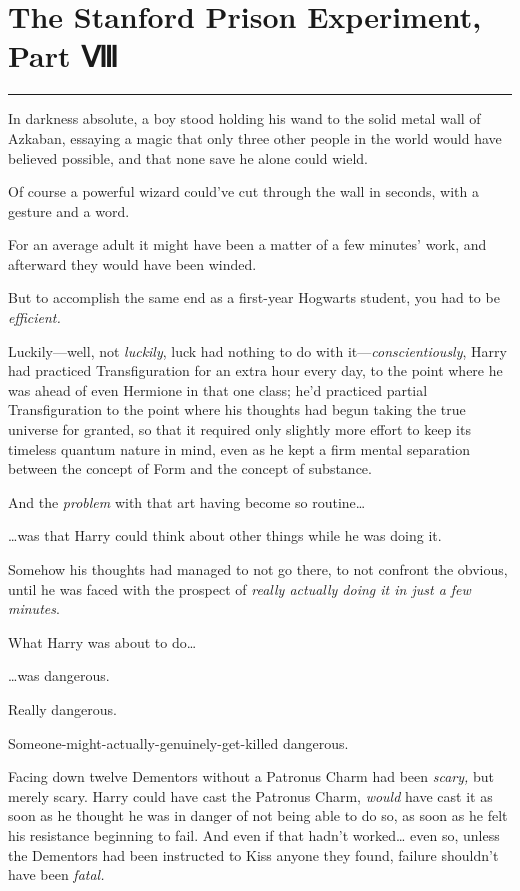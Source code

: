 \chapter{The Stanford Prison Experiment, Part Ⅷ}

\begin{center}\rule{3in}{0.4pt}\end{center}

In darkness absolute, a boy stood holding his wand to the solid metal
wall of Azkaban, essaying a magic that only three other people in the
world would have believed possible, and that none save he alone could
wield.

Of course a powerful wizard could've cut through the wall in seconds,
with a gesture and a word.

For an average adult it might have been a matter of a few minutes' work,
and afterward they would have been winded.

But to accomplish the same end as a first-year Hogwarts student, you had
to be \emph{efficient.}

Luckily---well, not \emph{luckily}, luck had nothing to do with
it---\emph{conscientiously}, Harry had practiced Transfiguration for an
extra hour every day, to the point where he was ahead of even Hermione
in that one class; he'd practiced partial Transfiguration to the point
where his thoughts had begun taking the true universe for granted, so
that it required only slightly more effort to keep its timeless quantum
nature in mind, even as he kept a firm mental separation between the
concept of Form and the concept of substance.

And the \emph{problem} with that art having become so routine\ldots{}

\ldots{}was that Harry could think about other things while he was doing
it.

Somehow his thoughts had managed to not go there, to not confront the
obvious, until he was faced with the prospect of \emph{really actually
doing it in just a few minutes}.

What Harry was about to do\ldots{}

\ldots{}was dangerous.

Really dangerous.

Someone-might-actually-genuinely-get-killed dangerous.

Facing down twelve Dementors without a Patronus Charm had been
\emph{scary,} but merely scary. Harry could have cast the Patronus
Charm, \emph{would} have cast it as soon as he thought he was in danger
of not being able to do so, as soon as he felt his resistance beginning
to fail. And even if that hadn't worked\ldots{} even so, unless the
Dementors had been instructed to Kiss anyone they found, failure
shouldn't have been \emph{fatal.}

